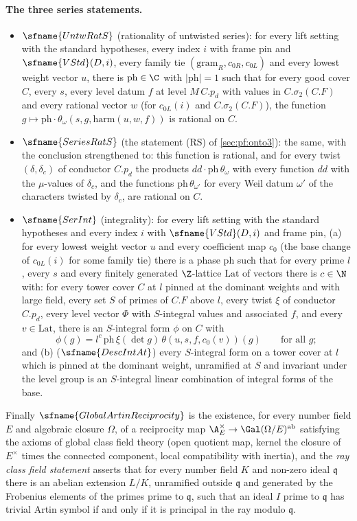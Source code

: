 \paragraph{The three series statements.}
\begin{itemize}
\item $\sfname{UntwRatS}$ (rationality of untwisted series): for every lift setting with the standard hypotheses, every index $i$
with frame pin and $\sfname{VStd}(D,i)$, every family tie $(\mathrm{gram}_R,c_{0R},c_{0L})$ and every lowest weight vector $u$, there
is $\mathrm{ph}\in\C$ with $|\mathrm{ph}|=1$ such that for every good cover $C$, every $s$, every level datum $f$ at level $M\,C.p_d$
with values in $C.\sigma_2(C.F)$ and every rational vector $w$ (for $c_{0L}(i)$ and $C.\sigma_2(C.F)$), the function
$g\mapsto\mathrm{ph}\cdot\theta_\omega(s,g,\mathrm{harm}(u,w,f))$ is rational on $C$.
\item $\sfname{SeriesRatS}$ (the statement (RS) of \cref{sec:pf:onto3}): the same, with the conclusion strengthened to: this
function is rational, and for every twist $(\delta,\delta_c)$ of conductor $C.p_d$ the products $dd\cdot\mathrm{ph}\,\theta_\omega$ with
every function $dd$ with the $\mu$-values of $\delta_c$, and the functions $\mathrm{ph}\,\theta_{\omega'}$ for every Weil datum $\omega'$
of the characters twisted by $\delta_c$, are rational on $C$.
\item $\sfname{SerInt}$ (integrality): for every lift setting with the standard hypotheses and every index $i$ with
$\sfname{VStd}(D,i)$ and frame pin, (a) for every lowest weight vector $u$ and every coefficient map $c_0$ (the base change of
$c_{0L}(i)$ for some family tie) there is a phase $\mathrm{ph}$ such that for every prime $l$, every $s$ and every finitely generated
$\Z$-lattice $\mathrm{Lat}$ of vectors there is $c\in\N$ with: for every tower cover $C$ at $l$ pinned at the dominant weights and
with large field, every set $S$ of primes of $C.F$ above $l$, every twist $\xi$ of conductor $C.p_d$, every level vector $\Phi$ with
$S$-integral values and associated $f$, and every $v\in\mathrm{Lat}$, there is an $S$-integral form $\phi$ on $C$ with
\[
\phi(g)=l^c\,\mathrm{ph}\,\xi(\det g)\,\theta(u,s,f,c_0(v))(g)\qquad\text{for all }g;
\]
and (b) ($\sfname{DescIntAt}$) every $S$-integral form on a tower cover at $l$ which is pinned at the dominant weight, unramified at
$S$ and invariant under the level group is an $S$-integral linear combination of integral forms of the base.
\end{itemize}
Finally $\sfname{GlobalArtinReciprocity}$ is the existence, for every number field $E$ and algebraic closure $\Omega$, of a
reciprocity map $\A_E^\times\to\Gal(\Omega/E)^{\mathrm{ab}}$ satisfying the axioms of global class field theory (open quotient map,
kernel the closure of $E^\times$ times the connected component, local compatibility with inertia), and the \emph{ray class field
statement} asserts that for every number field $K$ and non-zero ideal $\mathfrak q$ there is an abelian extension $L/K$, unramified
outside $\mathfrak q$ and generated by the Frobenius elements of the primes prime to $\mathfrak q$, such that an ideal $I$ prime to
$\mathfrak q$ has trivial Artin symbol if and only if it is principal in the ray modulo $\mathfrak q$.

